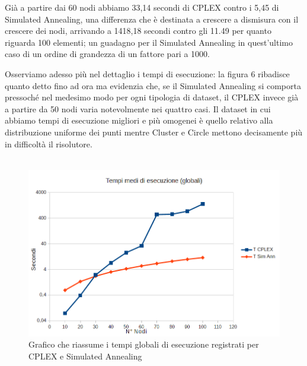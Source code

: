 \documentclass[preprint,12pt]{elsarticle}
\begin{document}
Già a partire dai 60 nodi abbiamo 33,14 secondi di CPLEX contro i 5,45 di Simulated Annealing, una differenza che è destinata a crescere a dismisura con il crescere dei nodi, arrivando a 1418,18 secondi contro gli 11.49 per quanto riguarda 100 elementi; un guadagno per il Simulated Annealing in quest'ultimo caso di un ordine di grandezza di un fattore pari a 1000.

Osserviamo adesso più nel dettaglio i tempi di esecuzione: la figura 6 ribadisce quanto detto fino ad ora ma evidenzia che, se il Simulated Annealing si comporta pressoché nel medesimo modo per ogni tipologia di dataset, il CPLEX invece già a partire da 50 nodi varia notevolmente nei quattro casi. Il dataset in cui abbiamo tempi di esecuzione migliori e più omogenei è quello relativo alla distribuzione uniforme dei punti mentre Cluster e Circle mettono decisamente più in difficoltà il risolutore. \\ \\


\begin{figure}[htbp]
\centering
\includegraphics[scale=0.50]{grafici_confronti/tempi_glob_esec.png} 
\caption{Grafico che riassume i tempi globali di esecuzione registrati per CPLEX e Simulated Annealing}\label{fig:5}
\end{figure}
\end{document}
